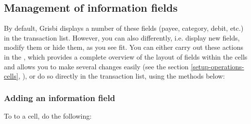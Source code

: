 \subsection{Management of information fields\label{transactions-list-fields-manage}}

By default, Grisbi displays a number of these fields (payee, category, debit, etc.) in the transaction list. However, you can also  differently, i.e. display new fields, modify them or hide them, as you see fit.
You can either carry out these actions in the , which provides a complete overview of the layout of fields within the cells and allows you to make several changes easily (see the section \vref{setup-operations-cells}, ), or do so directly in the transaction list, using the methods below:


\subsubsection{Adding an information field\label{transactions-list-fields-add}}

To  to a cell, do the following:

